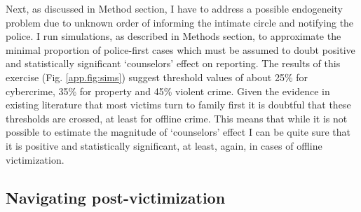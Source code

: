 \documentclass[]{interact}
\theoremstyle{plain}%
\theoremstyle{definition}
\theoremstyle{remark}
\newcommand\citep{\parencite}
\newcommand\citet{\textcite}
\begin{document}
	Next, as discussed in Method section, I have to address a possible endogeneity problem due to unknown order of informing the intimate circle and notifying the police. %
	I run simulations, as described in Methods section, to approximate the minimal proportion of police-first cases which must be assumed to doubt positive and statistically significant `counselors' effect on reporting. The results of this exercise (Fig. \ref{app.fig:sims}) suggest threshold values of about 25\% for cybercrime, 35\% for property and 45\% violent crime. Given the evidence in existing literature that most victims turn to family first \citep{ruback2001social, knoth2019reporting} it is doubtful that these thresholds are crossed, at least for offline crime. This means that while it is not possible to estimate the magnitude of `counselors' effect I can be quite sure that it is positive and statistically significant, at least, again, in cases of offline victimization.
	

	\subsection*{Navigating post-victimization}
	
\end{document}
